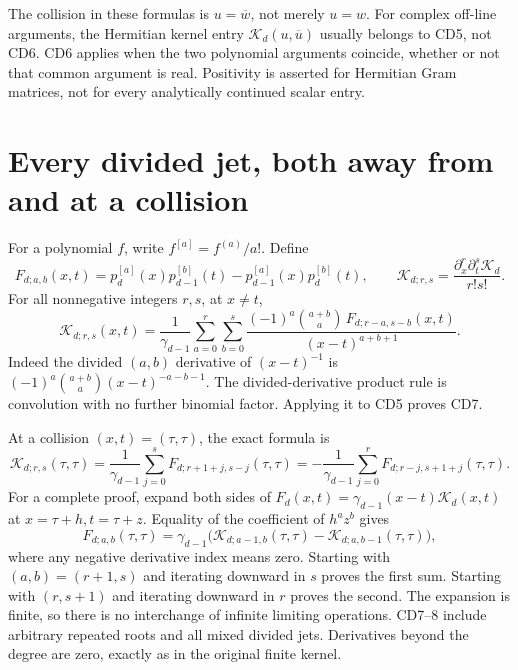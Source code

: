 \documentclass[11pt]{article}
\begin{document}
The collision in these formulas is \(u=\overline w\), not merely
\(u=w\). For complex off-line arguments, the Hermitian kernel entry
\(\mathcal K_d(u,\overline u)\) usually belongs to CD5, not CD6.
CD6 applies when the two polynomial arguments coincide, whether or not
that common argument is real. Positivity is asserted for Hermitian Gram
matrices, not for every analytically continued scalar entry.

\section{Every divided jet, both away from and at a collision}

For a polynomial \(f\), write \(f^{[a]}=f^{(a)}/a!\). Define
\[
 F_{d;a,b}(x,t)=p_d^{[a]}(x)p_{d-1}^{[b]}(t)
             -p_{d-1}^{[a]}(x)p_d^{[b]}(t),
 \qquad
 \mathcal K_{d;r,s}=\frac{\partial_x^r\partial_t^s\mathcal K_d}{r!s!}.
\]
For all nonnegative integers \(r,s\), at \(x\ne t\),
\begin{equation}\label{cdroot:eq:jets-away}
 \boxed{\mathcal K_{d;r,s}(x,t)=\frac1{\gamma_{d-1}}
  \sum_{a=0}^r\sum_{b=0}^s
  \frac{(-1)^a\binom{a+b}{a}\,
        F_{d;r-a,s-b}(x,t)}{(x-t)^{a+b+1}}.}
 \tag{CD7}
\end{equation}
Indeed the divided \((a,b)\) derivative of \((x-t)^{-1}\) is
\((-1)^a\binom{a+b}{a}(x-t)^{-a-b-1}\). The divided-derivative product
rule is convolution with no further binomial factor. Applying it to
CD5 proves CD7.

At a collision \((x,t)=(\tau,\tau)\), the exact formula is
\begin{equation}\label{cdroot:eq:jets-collision}
 \boxed{\mathcal K_{d;r,s}(\tau,\tau)
  =\frac1{\gamma_{d-1}}
      \sum_{j=0}^{s}F_{d;r+1+j,s-j}(\tau,\tau)
  =-\frac1{\gamma_{d-1}}
      \sum_{j=0}^{r}F_{d;r-j,s+1+j}(\tau,\tau).}
 \tag{CD8}
\end{equation}
For a complete proof, expand both sides of
\(F_d(x,t)=\gamma_{d-1}(x-t)\mathcal K_d(x,t)\) at
\(x=\tau+h,t=\tau+z\). Equality of the coefficient of \(h^az^b\)
gives
\[
 F_{d;a,b}(\tau,\tau)=\gamma_{d-1}
 \bigl(\mathcal K_{d;a-1,b}(\tau,\tau)
       -\mathcal K_{d;a,b-1}(\tau,\tau)\bigr),
\]
where any negative derivative index means zero. Starting with
\((a,b)=(r+1,s)\) and iterating downward in \(s\) proves the first
sum. Starting with \((r,s+1)\) and iterating downward in \(r\)
proves the second. The expansion is finite, so there is no interchange
of infinite limiting operations. CD7--8 include arbitrary repeated
roots and all mixed divided jets. Derivatives beyond the degree are
zero, exactly as in the original finite kernel.
\end{document}
